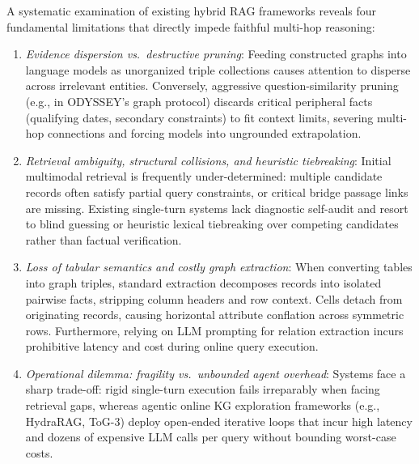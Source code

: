 \documentclass[runningheads]{llncs}
\begin{document}
A systematic examination of existing hybrid RAG frameworks reveals four fundamental limitations that directly impede faithful multi-hop reasoning:
\begin{enumerate}
    \item \emph{Evidence dispersion vs.\ destructive pruning}: Feeding constructed graphs into language models as unorganized triple collections causes attention to disperse across irrelevant entities. Conversely, aggressive question-similarity pruning (e.g., in ODYSSEY's graph protocol) discards critical peripheral facts (qualifying dates, secondary constraints) to fit context limits, severing multi-hop connections and forcing models into ungrounded extrapolation.
    \item \emph{Retrieval ambiguity, structural collisions, and heuristic tiebreaking}: Initial multimodal retrieval is frequently under-determined: multiple candidate records often satisfy partial query constraints, or critical bridge passage links are missing. Existing single-turn systems lack diagnostic self-audit and resort to blind guessing or heuristic lexical tiebreaking over competing candidates rather than factual verification.
    \item \emph{Loss of tabular semantics and costly graph extraction}: When converting tables into graph triples, standard extraction decomposes records into isolated pairwise facts, stripping column headers and row context. Cells detach from originating records, causing horizontal attribute conflation across symmetric rows. Furthermore, relying on LLM prompting for relation extraction incurs prohibitive latency and cost during online query execution.
    \item \emph{Operational dilemma: fragility vs.\ unbounded agent overhead}: Systems face a sharp trade-off: rigid single-turn execution fails irreparably when facing retrieval gaps, whereas agentic online KG exploration frameworks (e.g., HydraRAG, ToG-3) deploy open-ended iterative loops that incur high latency and dozens of expensive LLM calls per query without bounding worst-case costs.
\end{enumerate}
\end{document}
